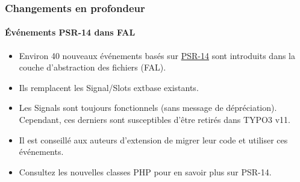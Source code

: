 
\begin{frame}[fragile]
	\frametitle{Changements en profondeur}
	\framesubtitle{Événements PSR-14 dans FAL}

	\lstset{basicstyle=\tiny\ttfamily}

	\begin{itemize}
		\item Environ 40 nouveaux événements basés sur
			\href{https://www.php-fig.org/psr/psr-14/}{PSR-14}
			sont introduits dans la couche d'abstraction des fichiers (FAL).
		\item Ils remplacent les Signal/Slots extbase existants.
		\item Les Signals sont toujours fonctionnels (sans message de dépréciation).
			Cependant, ces derniers sont susceptibles d'être retirés dans TYPO3 v11.
		\item Il est conseillé aux auteurs d'extension de migrer leur code et utiliser ces événements.
		\item Consultez les nouvelles classes PHP pour en savoir plus sur PSR-14.
	\end{itemize}

\end{frame}



